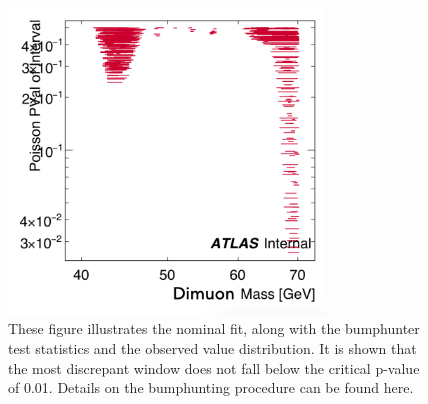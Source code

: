\begin{figure}[!htb]
\begin{center}
        \includegraphics[width=0.75\textwidth]{figures/chapter_dimuon/NominalFit}        
        \caption{
        These figure illustrates the nominal fit, along with the bumphunter test statistics and the observed value distribution. It is shown that the most discrepant window does not fall below the critical p-value of 0.01. Details on the bumphunting procedure can be found here. }
            \label{fig:dimuonstudies}
    \end{center}
\end{figure}


